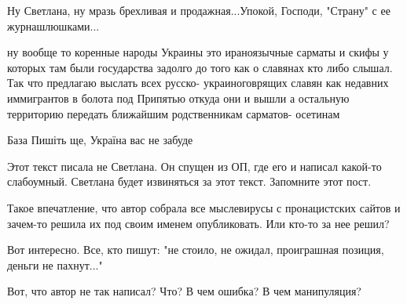 \begin{itemize}
Ну Светлана, ну мразь брехливая и продажная...Упокой, Господи, "Страну" с ее журнашлюшками...

 

ну вообще то коренные народы Украины это ираноязычные сарматы и скифы у которых
там были государства задолго до того как о славянах кто либо слышал. Так что
предлагаю выслать всех русско- украиноговрящих славян как недавних иммигрантов
в болота под Припятью откуда они и вышли а остальную территорию передать
ближайшим родственникам сарматов- осетинам

 
База
Пишіть ще, Україна вас не забуде

 
Этот текст писала не Светлана. Он спущен из ОП, где его и написал какой-то слабоумный. Светлана будет извиняться за этот текст. Запомните этот пост.

 
Такое впечатление, что автор собрала все мыслевирусы с пронацистских сайтов и зачем-то решила их под своим именем опубликовать. Или кто-то за нее решил?

 
Вот интересно. Все, кто пишут: "не стоило, не ожидал, проиграшная позиция, деньги не пахнут..."

Вот, что автор не так написал? Что? В чем ошибка? В чем манипуляция?


\end{itemize}
